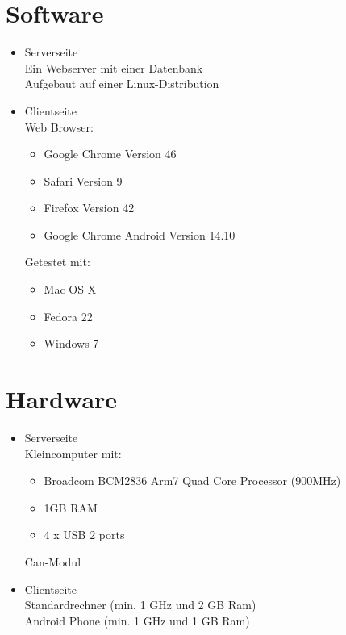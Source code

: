 \documentclass[pflichtenheft.tex]{subfiles}
\begin{document}
\section{Software}
\begin{itemize}
\item
Serverseite\\
Ein Webserver mit einer Datenbank\\
Aufgebaut auf einer Linux-Distribution
\item
Clientseite\\
Web Browser:
\begin{itemize}
\item
Google Chrome Version 46
\item
Safari Version 9
\item
Firefox Version 42
\item
Google Chrome Android Version 14.10
\end{itemize}
Getestet mit:
\begin{itemize}
\item
Mac OS X
\item
Fedora 22
\item
Windows 7
\end{itemize}
\end{itemize}


\section{Hardware}
\begin{itemize}
\item
Serverseite\\
Kleincomputer mit:
\begin{itemize}
\item
Broadcom BCM2836 Arm7 Quad Core Processor (900MHz)
\item
1GB RAM
\item
4 x USB 2 ports
\end{itemize}
Can-Modul
\item
Clientseite\\
Standardrechner (min. 1 GHz und 2 GB Ram)\\
Android Phone (min. 1 GHz und 1 GB Ram)
\end{itemize}
\end{document}
